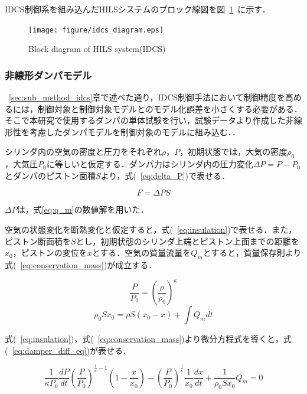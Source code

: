 \documentclass[a4paper,12pt]{article_vdlab_sotsuron}
\begin{document}
IDCS制御系を組み込んだHILSシステムのブロック線図を図~\ref{fig:idcs_diagram}~に示す．

\vspace*{7mm}
\begin{figure}[htp]
  \begin{center}
    \texttt{[image: figure/idcs\_diagram.eps]}
    \vspace*{3mm}
    \caption{Block diagram of HILS system(IDCS)}
    \label{fig:idcs_diagram}
  \end{center}
\end{figure}
\newpage

\subsubsection{非線形ダンパモデル}
~\ref{sec:sub_method_idcs}章で述べた通り，IDCS制御手法において制御精度を高めるには，制御対象と制御対象モデルとのモデル化誤差を小さくする必要がある．そこで本研究で使用するダンパの単体試験を行い，試験データより作成した非線形性を考慮したダンパモデルを制御対象のモデルに組み込む．．

シリンダ内の空気の密度と圧力をそれぞれ$\rho$，$P$，初期状態では，大気の密度$\rho_0$，大気圧$P_0$に等しいと仮定する．ダンパ力はシリンダ内の圧力変化$\Delta P = P-P_0$とダンパのピストン面積$S$より，式(~\ref{eq:delta_P})で表せる．

\begin{equation}
  F = \Delta PS \label{eq:delta_P}
\end{equation}

$\Delta P$は，式\ref{eq:q_m}の数値解を用いた．

空気の状態変化を断熱変化と仮定すると，式(~\ref{eq:insulation})で表せる．また，ピストン断面積を$S$とし，初期状態のシリンダ上端とピストン上面までの距離を$x_0$，ピストンの変位を$x$とする．空気の質量流量を$Q_m$とすると，質量保存則より式(~\ref{eq:conservation_mass})が成立する．

\begin{equation}
  \frac{P}{P_0} = \left(\frac{\rho}{\rho_0} \right)^\kappa \label{eq:insulation}
\end{equation}
\begin{equation}
  \rho_0 S x_0 = \rho S(x_0 - x) + \int Q_m dt \label{eq:conservation_mass}
\end{equation}

式(~\ref{eq:insulation})，式(~\ref{eq:conservation_mass})より微分方程式を導くと，式(~\ref{eq:damper_diff_eq})が表せる．

\begin{equation}
  \frac{1}{\kappa P_0} \frac{dP}{dt} \left(\frac{P}{P_0} \right)^{\frac{1}{\kappa} -1} \left(1 - \frac{x}{x_0} \right) - \left(\frac{P}{P_0} \right)^{\frac{1}{\kappa}} \frac{1}{x_0} \frac{dx}{dt} + \frac{1}{\rho_0 S x_0} Q_m = 0 \label{eq:damper_diff_eq}
\end{equation}
\end{document}
